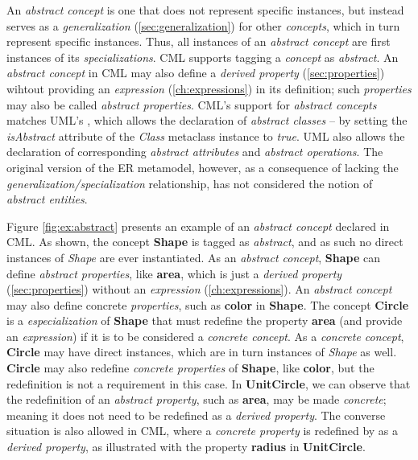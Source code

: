 \begin{definition}
An \emph{abstract concept} is one that does not represent specific instances,
but instead serves as a \emph{generalization} (\ref{sec:generalization}) 
for other \emph{concepts},
which in turn represent specific instances.
Thus, all instances of an \emph{abstract concept}
are first instances of its \emph{specializations}.
CML supports tagging a \emph{concept} as \emph{abstract}.
An \emph{abstract concept} in CML may also define a \emph{derived property} (\ref{sec:properties})
wihtout providing an \emph{expression} (\ref{ch:expressions}) in its definition;
such \emph{properties} may also be called \emph{abstract properties}.
CML's support for \emph{abstract concepts} matches UML's \cite{uml},
which allows the declaration of \emph{abstract classes}
-- by setting the \emph{isAbstract} attribute of the \emph{Class} metaclass instance to \emph{true}.
UML also allows the declaration of corresponding \emph{abstract attributes} and \emph{abstract operations}.
The original version of the ER \cite{er} metamodel, however,
as a consequence of lacking the \emph{generalization/specialization} relationship,
has not considered the notion of \emph{abstract entities}.
\end{definition}

\begin{examples}
Figure \ref{fig:ex:abstract} presents an example of an \emph{abstract concept} declared in CML.
As shown, the concept \textbf{Shape} is tagged as \emph{abstract},
and as such no direct instances of \emph{Shape} are ever instantiated.
As an \emph{abstract concept}, \textbf{Shape} can define \emph{abstract properties},
like \textbf{area}, which is just a \emph{derived property} (\ref{sec:properties})
without an \emph{expression} (\ref{ch:expressions}).
An \emph{abstract concept} may also define concrete \emph{properties},
such as \textbf{color} in \textbf{Shape}.
The concept \textbf{Circle} is a \emph{especialization} of \textbf{Shape}
that must redefine the property \textbf{area}
(and provide an \emph{expression})
if it is to be considered a \emph{concrete concept}.
As a \emph{concrete concept},
\textbf{Circle} may have direct instances,
which are in turn instances of \emph{Shape} as well.
\textbf{Circle} may also redefine \emph{concrete properties} of \textbf{Shape},
like \textbf{color},
but the redefinition is not a requirement in this case.
In \textbf{UnitCircle},
we can observe that the redefinition of an \emph{abstract property},
such as \textbf{area},
may be made \emph{concrete};
meaning it does not need to be redefined as a \emph{derived property}.
The converse situation is also allowed in CML,
where a \emph{concrete property} is redefined by as a \emph{derived property},
as illustrated with the property \textbf{radius} in \textbf{UnitCircle}.
\end{examples}

